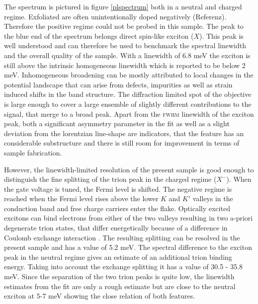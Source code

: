 The \pl spectrum is pictured in figure \ref{plspectrum} both in a neutral and charged regime. Exfoliated \tmds are often unintentionally doped negatively (Referenz). Therefore the positive regime could not be probed in this sample. The peak to the blue end of the spectrum belongs direct spin-like exciton ($X$). This peak is well understood and can therefore be used to benchmark the spectral linewidth and the overall quality of the sample. With a linewidth of 6.8 meV the exciton is still above the intrinsic homogeneous linewidth which is reported to be below 2 meV\cite{moody_intrinsic_2015, ajayi_approaching_2017}. Inhomogeneous broadening can be mostly attributed to local changes in the potential landscape that can arise from defects, impurities as well as strain induced shifts in the band structure\cite{zhu_strain_2013}. The diffraction limited spot of the objective is large enough to cover a large ensemble of slightly different contributions to the \pl signal, that merge to a broad peak. Apart from the \textsc{fwhm} linewidth of the exciton peak, both a significant asymmetry parameter in the fit as well as a slight deviation from the lorentzian line-shape are indicators, that the feature has an considerable substructure and there is still room for improvement in terms of sample fabrication.

However, the linewidth-limited resolution of the present sample is good enough to distinguish the fine splitting of the trion peak in the charged regime ($X^-$). When the gate voltage is tuned, the Fermi level is shifted. The negative regime is reached when the Fermi level rises above the lower $K$ and $K'$ valleys in the conduction band and free charge carriers enter the flake. Optically excited excitons can bind electrons from either of the two valleys resulting in two a-priori degenerate trion states, that differ energetically because of a difference in Coulomb exchange interaction \cite{courtade_charged_2017}. The resulting splitting can be resolved in the present sample and has a value of 5.2 meV. The spectral difference to the exciton peak in the neutral regime gives an estimate of an additional trion binding energy. Taking into account the exchange splitting it has a value of 30.5 - 35.8 meV. Since the separation of the two trion peaks is quite low, the linewidth estimates from the fit are only a rough estimate but are close to the neutral exciton at 5-7 meV showing the close relation of both features. 

